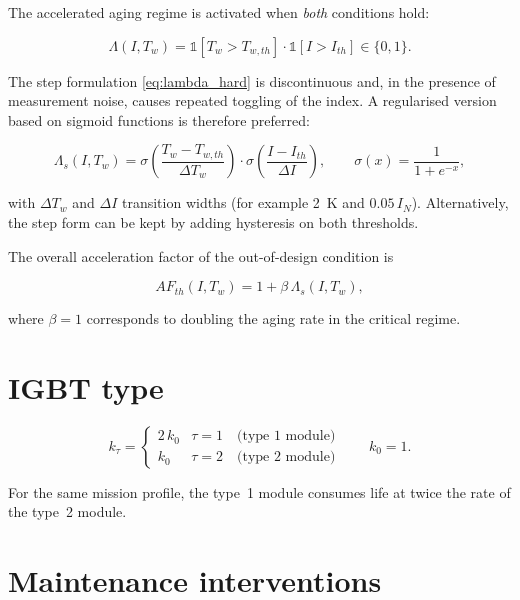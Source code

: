 \documentclass[11pt,a4paper]{article}
\begin{document}
The accelerated aging regime is activated when \emph{both} conditions hold:

\begin{equation}
  \Lambda(I,T_w) =
  \mathbb{1}\!\left[T_w > T_{w,th}\right]\cdot
  \mathbb{1}\!\left[I > I_{th}\right] \in \{0,1\}.
  \label{eq:lambda_hard}
\end{equation}

The step formulation \eqref{eq:lambda_hard} is discontinuous and, in the
presence of measurement noise, causes repeated toggling of the index. A
regularised version based on sigmoid functions is therefore preferred:

\begin{equation}
  \Lambda_s(I,T_w) =
  \sigma\!\left(\frac{T_w - T_{w,th}}{\Delta T_w}\right)\cdot
  \sigma\!\left(\frac{I - I_{th}}{\Delta I}\right),
  \qquad
  \sigma(x) = \frac{1}{1+e^{-x}} ,
  \label{eq:lambda_soft}
\end{equation}

with $\Delta T_w$ and $\Delta I$ transition widths (for example \SI{2}{\kelvin}
and $0.05\,I_N$). Alternatively, the step form can be kept by adding hysteresis
on both thresholds.

The overall acceleration factor of the out-of-design condition is

\begin{equation}
  AF_{th}(I,T_w) = 1 + \beta\,\Lambda_s(I,T_w),
\end{equation}

where $\beta = 1$ corresponds to doubling the aging rate in the critical
regime.

\section{IGBT type}

\begin{equation}
  k_\tau =
  \begin{cases}
    2\,k_0 & \tau = 1 \quad \text{(type 1 module)}\\[2pt]
    k_0    & \tau = 2 \quad \text{(type 2 module)}
  \end{cases}
  \qquad k_0 = 1 .
  \label{eq:tipo}
\end{equation}

For the same mission profile, the type~1 module consumes life at twice the rate
of the type~2 module.

\section{Maintenance interventions}
\end{document}
